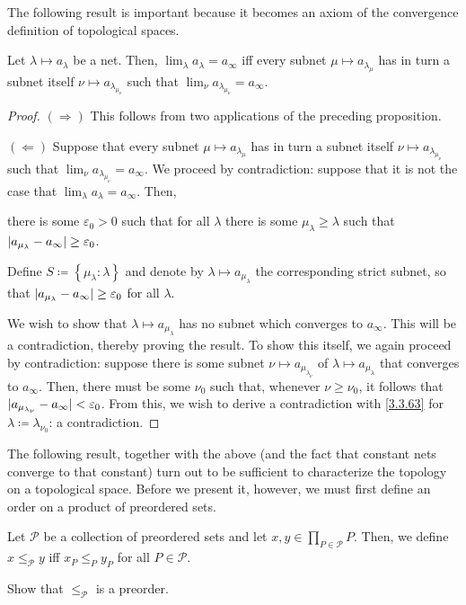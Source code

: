 The following result is important because it becomes an axiom of the convergence definition of topological spaces.
\begin{prp}\label{prp3.3.95}
Let $\lambda \mapsto a_\lambda$ be a net.  Then, $\lim _\lambda a_\lambda =a_\infty$ iff every subnet $\mu \mapsto a_{\lambda _\mu}$ has in turn a subnet itself $\nu \mapsto a_{\lambda _{\mu _\nu}}$ such that $\lim _\nu a_{\lambda _{\mu _\nu}}=a_\infty$.
\begin{proof}
$(\Rightarrow )$ This follows from two applications of the preceding proposition.

\blankline
\noindent
$(\Leftarrow )$ Suppose that every subnet $\mu \mapsto a_{\lambda _\mu}$ has in turn a subnet itself $\nu \mapsto a_{\lambda _{\mu _\nu}}$ such that $\lim _\nu a_{\lambda _{\mu _\nu}}=a_\infty$.  We proceed by contradiction:  suppose that it is not the case that $\lim _\lambda a_\lambda =a_\infty$.  Then,
\begin{textequation}[3.3.63]
there is some $\varepsilon _0>0$ such that for all $\lambda$ there is some $\mu _\lambda \geq \lambda$ such that $\lvert a_{\mu _\lambda}-a_\infty\rvert\geq \varepsilon _0$.
\end{textequation}
Define $S\coloneqq \left\{ \mu _\lambda :\lambda \right\}$ and denote by $\lambda \mapsto a_{\mu _\lambda}$ the corresponding strict subnet, so that $\lvert a_{\mu _\lambda}-a_\infty\rvert\geq \varepsilon _0$ for all $\lambda$.

We wish to show that $\lambda \mapsto a_{\mu _\lambda}$ has no subnet which converges to $a_\infty$.  This will be a contradiction, thereby proving the result.  To show this itself, we again proceed by contradiction:  suppose there is some subnet $\nu \mapsto a_{\mu _{\lambda _\nu}}$ of $\lambda \mapsto a_{\mu _\lambda}$ that converges to $a_\infty$.  Then, there must be some $\nu _0$ such that, whenever $\nu \geq \nu _0$, it follows that $\lvert a_{\mu _{\lambda _\nu}}-a_\infty\rvert<\varepsilon _0$.  From this, we wish to derive a contradiction with \eqref{3.3.63} for $\lambda \coloneqq \lambda _{\nu _0}$:  a contradiction.
\end{proof}
\end{prp}
The following result, together with the above (and the fact that constant nets converge to that constant) turn out to be sufficient to characterize the topology on a topological space.  Before we present it, however, we must first define an order on a product of preordered sets.
\begin{dfn}
Let $\mathcal{P}$ be a collection of preordered sets and let $x,y\in \prod _{P\in \mathcal{P}}P$.  Then, we define $x\leq _{\mathcal{P}}y$ iff $x_P\leq _Py_P$ for all $P\in \mathcal{P}$.
\begin{exr}
Show that $\leq _{\mathcal{P}}$ is a preorder.
\end{exr}
\end{dfn}
